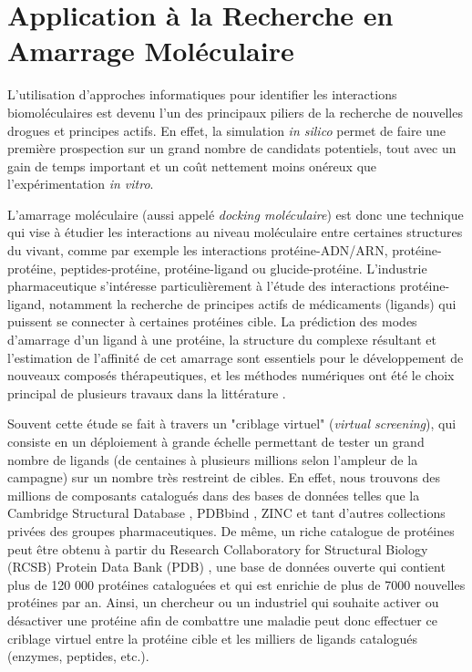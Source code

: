 \section{Application à la Recherche en Amarrage Moléculaire} \label{sec:Vasseur}

L'utilisation d'approches informatiques pour identifier les interactions biomoléculaires est devenu l'un des principaux piliers de la recherche de nouvelles drogues et principes actifs. En effet, la simulation \emph{in silico} permet de faire une première prospection sur un grand nombre de candidats potentiels, tout avec un gain de temps important et un coût nettement moins onéreux que l'expérimentation \emph{in vitro}. 

L'amarrage moléculaire (aussi appelé \emph{docking moléculaire}) est donc une technique qui vise à étudier les interactions au niveau moléculaire entre certaines structures du vivant, comme par exemple les interactions protéine-ADN/ARN, protéine-protéine, peptides-protéine, protéine-ligand ou glucide-protéine. L'industrie pharmaceutique s'intéresse particulièrement à l'étude des interactions protéine-ligand, notamment la recherche de principes actifs de médicaments (ligands) qui puissent se connecter à certaines protéines cible. La prédiction des modes d'amarrage d'un ligand à une protéine, la structure du complexe résultant et l'estimation de l'affinité de cet amarrage sont essentiels pour le développement de nouveaux composés thérapeutiques, et les méthodes numériques ont été le choix principal de plusieurs travaux dans la littérature \cite{Abagyan2001,Giganti2010, Klebe2006}.

 Souvent cette étude se fait à travers un "criblage virtuel" (\emph{virtual screening}), qui consiste en un déploiement à grande échelle permettant de tester un grand nombre de ligands (de centaines à plusieurs millions selon l'ampleur de la campagne) sur un nombre très restreint de cibles. En effet, nous trouvons des millions de composants catalogués dans des bases de données telles que la Cambridge Structural Database \cite{Allen2002}, PDBbind  \cite{Wang2004, Wang2005}, ZINC \cite{Irwin2005} et tant d'autres collections privées des groupes pharmaceutiques. De même, un riche catalogue de protéines peut être obtenu à partir du Research Collaboratory for Structural Biology (RCSB) Protein Data Bank (PDB) \cite{PDB}, une base de données ouverte qui contient plus de 120 000 protéines cataloguées et qui est enrichie de plus de 7000 nouvelles protéines par an. Ainsi, un chercheur ou un industriel qui souhaite activer ou désactiver une protéine afin de combattre une maladie peut donc effectuer ce criblage virtuel entre la protéine cible et les milliers de ligands catalogués (enzymes, peptides, etc.).  

